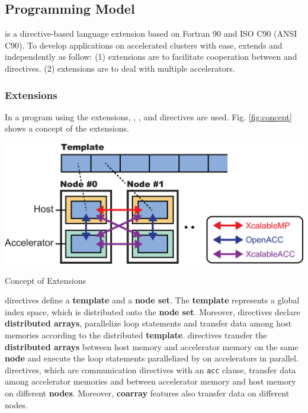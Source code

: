 \subsection{Programming Model}
{\XACC} is a directive-based language extension based on Fortran 90 and ISO C90 (ANSI C90).
To develop applications on accelerated clusters with ease,
{\XACC} extends {\XACC} and {\OACC} independently as follow:
(1) {\XMP} extensions are to facilitate cooperation between {\XMP} and {\OACC} directives.
(2) {\OACC} extensions are to deal with multiple accelerators.

\subsubsection{{\XMP} Extensions}
In a program using the {\XMP} extensions,
{\XMP}, {\OACC}, and {\XACC} directives are used.
Fig. \ref{fig:concept} shows a concept of the {\XMP} extensions.

\begin{myfigure}
\includegraphics[scale=0.5,clip]{figs/concept.eps}
  \caption{Concept of {\XMP} Extensions}\label{fig:concept}
\end{myfigure}

{\XMP} directives define a {\bf template} and a {\bf node set}.
The {\bf template} represents a global index space, which is distributed onto the {\bf node set}.
Moreover, {\XMP} directives declare {\bf distributed arrays},
parallelize loop statements and transfer data among host memories according to the distributed {\bf template}.
{\OACC} directives transfer the {\bf distributed arrays} between host memory and accelerator memory on the same {\bf node}
and execute the loop statements parallelized by {\XMP} on accelerators in parallel.
{\XACC} directives, which are {\XMP} communication directives with an {\tt acc} clause, 
transfer data among accelerator memories and between accelerator memory and host memory on different {\bf nodes}.
Moreover, 
{\bf coarray} features also transfer data on different nodes.

